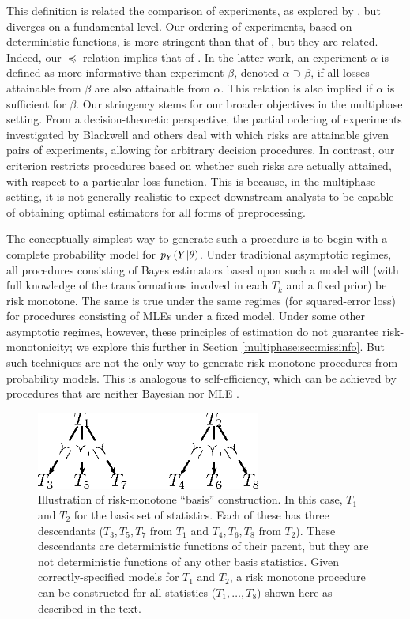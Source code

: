 This definition is related the comparison of experiments, as explored by \citet{Blackwell51,Blackwell53}, but diverges on a fundamental level.
Our ordering of experiments, based on deterministic functions, is more stringent than that of \cite{Blackwell53}, but they are related.
Indeed, our $\preceq$ relation implies that of \citet{Blackwell53}.
In the latter work, an experiment $\alpha$ is defined as more informative than experiment $\beta$, denoted $\alpha \supset \beta$, if all losses attainable from $\beta$ are also attainable from $\alpha$.
This relation is also implied if $\alpha$ is sufficient for $\beta$.
Our stringency stems for our broader objectives in the multiphase setting.
From a decision-theoretic perspective, the partial ordering of experiments investigated by Blackwell and others deal with which risks are attainable given pairs of experiments, allowing for arbitrary decision procedures.
In contrast, our criterion restricts procedures based on whether such risks are actually attained, with respect to a particular loss function.
This is because, in the multiphase setting, it is not generally realistic to expect downstream analysts to be capable of obtaining optimal estimators for all forms of preprocessing.

The conceptually-simplest way to generate such a procedure is to begin with a complete probability model for $p_Y(Y | \theta)$.
Under traditional asymptotic regimes, all procedures consisting of Bayes estimators based upon such a model will (with full knowledge of the transformations involved in each $T_k$ and a fixed prior) be risk monotone.
The same is true under the same regimes (for squared-error loss) for procedures consisting of MLEs under a fixed model.
Under some other asymptotic regimes, however, these principles of estimation do not guarantee risk-monotonicity; we explore this further in Section \ref{multiphase:sec:missinfo}.
But such techniques are not the only way to generate risk monotone procedures from probability models.
This is analogous to self-efficiency, which can be achieved by procedures that are neither Bayesian nor MLE \citep{Meng1994,Xie2012}.

\begin{figure}
\centering
\includegraphics[height=1in]{figures/multiphase/diagram_risk-monotone.eps}
\caption{Illustration of risk-monotone ``basis'' construction. In this case, $T_1$ and $T_2$ for the basis set of statistics. Each of these has three descendants ($T_3, T_5, T_7$ from $T_1$ and $T_4, T_6, T_8$ from $T_2$). These descendants are deterministic functions of their parent, but they are not deterministic functions of any other basis statistics. Given correctly-specified models for $T_1$ and $T_2$, a risk monotone procedure can be constructed for all statistics ($T_1, \ldots, T_8$) shown here as described in the text.
\label{multiphase:fig:risk-monotone}}
\end{figure}

